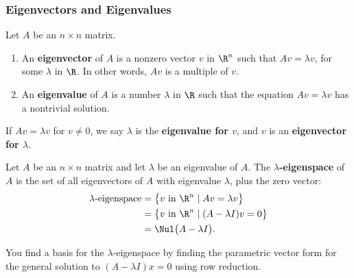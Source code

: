

\usetikzlibrary{angles,decorations.pathreplacing}




\begin{frame}
\frametitle{Eigenvectors and Eigenvalues}

\vskip-3mm
\begin{defn}
  Let $A$ be an $n\times n$ matrix.
  \begin{enumerate}
  \item An \textbf{eigenvector} of $A$ is a nonzero vector $v$ in
    $\R^n$ such that $Av = \lambda v$, for some $\lambda$ in $\R$.
    In other words, $Av$ is a multiple of $v$.
  \item An \textbf{eigenvalue} of $A$ is a number $\lambda$ in $\R$ such that the
    equation $Av=\lambda v$ has a nontrivial solution.
  \end{enumerate}
  If $Av = \lambda v$ for $v\neq 0$, we say $\lambda$ is the
  \textbf{eigenvalue for $v$}, and $v$ is an \textbf{eigenvector for $\lambda$}.
\end{defn}

\pause
\begin{defn}
  Let $A$ be an $n\times n$ matrix and let $\lambda$ be an eigenvalue of $A$.
  The \textbf{$\lambda$-eigenspace} of $A$ is the set of all eigenvectors of $A$
  with eigenvalue $\lambda$, plus the zero vector:
  \[\begin{split} \text{$\lambda$-eigenspace}
    &= \bigl\{ v\text{ in }\R^n\mid Av = \lambda v \bigr\} \\
    &= \bigl\{ v\text{ in }\R^n\mid (A-\lambda I)v = 0 \bigr\} \\
    &= \Nul\bigl( A-\lambda I \bigr).
  \end{split}\]
\end{defn}

\pause
You find a basis for the $\lambda$-eigenspace by finding the parametric vector
form for the general solution to $(A-\lambda I)x=0$ using row reduction.

\end{frame}



